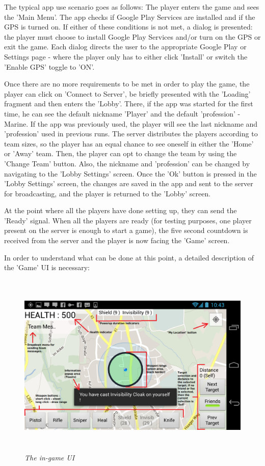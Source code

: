 \documentclass{article}
\begin{document}
The typical app use scenario goes as follows: The player enters the game and
sees the 'Main Menu'. The app checks if Google Play Services are installed and
if the GPS is turned on. If either of these conditions is not met, a dialog is
presented: the player must choose to install Google Play Services and/or turn on
the GPS or exit the game. Each dialog directs the user to the appropriate Google
Play or Settings page - where the player only has to either click 'Install' or
switch the 'Enable GPS' toggle to 'ON'.\newline

Once there are no more requirements to be met in order to play the game, the
player can click on 'Connect to Server', be briefly presented with the 'Loading'
fragment and then enters the 'Lobby'. There, if the app was started for the
first time, he can see the default nickname 'Player' and the default
'profession' - Marine. If the app was previously used, the player will see the
last nickname and 'profession' used in previous runs. The server distributes the
players according to team sizes, so the player has an equal chance to see
oneself in either the 'Home' or 'Away' team. Then, the player can opt to change
the team by using the 'Change Team' button. Also, the nickname and 'profession'
can be changed by navigating to the 'Lobby Settings' screen. Once the 'Ok'
button is pressed in the 'Lobby Settings' screen, the changes are saved in the
app and sent to the server for broadcasting, and the player is returned
to the 'Lobby' screen.\newline

At the point where all the players have done setting up, they can send the
'Ready' signal. When all the players are ready (for testing purposes, one
player present on the server is enough to start a game), the five second
countdown is received from the server and the player is now facing the 'Game'
screen.\newline

In order to understand what can be done at this point, a detailed description of
the 'Game' UI is necessary: \newline
 
\begin{figure}
\includegraphics[height=3.5in,width=6.23in]{./images/android_screenshots/tutorial_game.png}  
\caption{\small \sl The in-game UI \label{fig:game_ui}}
\end{figure}
\end{document}
